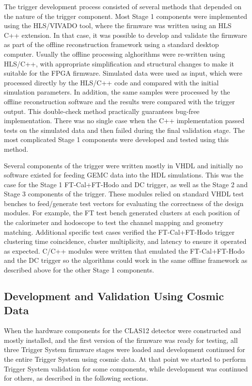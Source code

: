 The trigger development process consisted of several methods that depended on the nature of the trigger component. Most Stage 1 components were implemented using the HLS/VIVADO tool, where the firmware was written using an HLS C++ extension. In that case, it was possible to develop and validate the firmware as part of the offline reconstruction framework using a standard desktop computer. Usually the offline processing alghorithms were re-written using HLS/C++, with appropriate simplification and structural changes to make it suitable for the FPGA firmware. Simulated data were used as input, which were processed directly by the HLS/C++ code and compared with the initial simulation parameters. In addition, the same samples were processed by the offline reconstruction software and the results were compared with the trigger output. This double-check method practically guarantees bug-free implementation. There was no single case when the C++ implementation passed tests on the simulated data and then failed during the final validation stage. The most complicated Stage 1 components were developed and tested using this method.

Several components of the trigger were written mostly in VHDL and initially no software existed for feeding GEMC data into the HDL simulations. This was the case for the Stage 1 FT-Cal+FT-Hodo and DC trigger, as well as the Stage 2 and Stage 3 components of the trigger. These modules relied on standard VHDL test benches to feed/generate test vectors for evaluating the correctness of the design modules. For example, the FT test bench generated clusters at each position of the calorimeter and hodoscope to test the channel mapping and geometry matching. Additional specific test cases verified the FT-Cal+FT-Hodo trigger clustering time coincidence, cluster multiplicity, and latency to ensure it operated as expected. C/C++ modules were written that emulated the FT-Cal+FT-Hodo and the DC trigger so the algorithms could work in the same offline framework as described above for the other Stage 1 components.

\subsection{Development and Validation Using Cosmic Data}

When the hardware components for the CLAS12 detector were constructed and mostly installed, and the first version of the firmware was ready for testing, all three Trigger System firmware stages were loaded and development continued for the entire Trigger System using cosmic data. At that point we started to perform Trigger System validation for some components, while development was continued for others, as described in the following sections.

